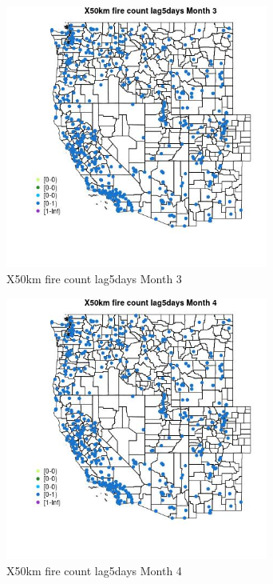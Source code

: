\begin{figure} 
\centering  
\includegraphics[width=0.77\textwidth]{Code_Outputs/Report_ML_input_PM25_Step4_part_e_de_duplicated_aves_compiled_2019-05-14wNAs_MapObsMo3X50km_fire_count_lag5days.jpg} 
\caption{\label{fig:Report_ML_input_PM25_Step4_part_e_de_duplicated_aves_compiled_2019-05-14wNAsMapObsMo3X50km_fire_count_lag5days}X50km fire count lag5days Month 3} 
\end{figure} 
 

\clearpage 

\begin{figure} 
\centering  
\includegraphics[width=0.77\textwidth]{Code_Outputs/Report_ML_input_PM25_Step4_part_e_de_duplicated_aves_compiled_2019-05-14wNAs_MapObsMo4X50km_fire_count_lag5days.jpg} 
\caption{\label{fig:Report_ML_input_PM25_Step4_part_e_de_duplicated_aves_compiled_2019-05-14wNAsMapObsMo4X50km_fire_count_lag5days}X50km fire count lag5days Month 4} 
\end{figure} 
 

